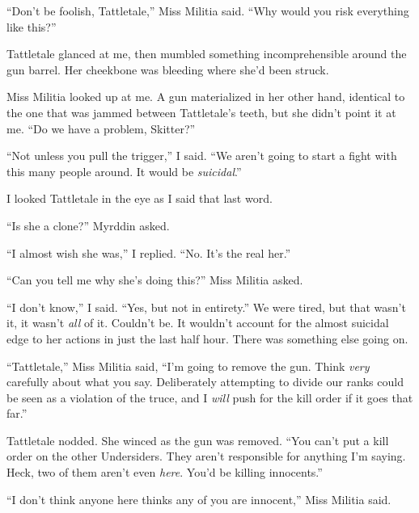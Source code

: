 ``Don't be foolish, Tattletale,'' Miss Militia said.  ``Why would you risk everything like this?''



Tattletale glanced at me, then mumbled something incomprehensible around the gun barrel.  Her cheekbone was bleeding where she'd been struck.



Miss Militia looked up at me.  A gun materialized in her other hand, identical to the one that was jammed between Tattletale's teeth, but she didn't point it at me.  ``Do we have a problem, Skitter?''



``Not unless you pull the trigger,'' I said.  ``We aren't going to start a fight with this many people around.  It would be \emph{suicidal}.''



I looked Tattletale in the eye as I said that last word.



``Is she a clone?'' Myrddin asked.



``I almost wish she was,'' I replied.  ``No.  It's the real her.''



``Can you tell me why she's doing this?'' Miss Militia asked.



``I don't know,'' I said.  ``Yes, but not in entirety.''  We were tired, but that wasn't it, it wasn't \emph{all} of it.  Couldn't be.  It wouldn't account for the almost suicidal edge to her actions in just the last half hour.  There was something else going on.



``Tattletale,'' Miss Militia said, ``I'm going to remove the gun.  Think \emph{very} carefully about what you say.  Deliberately attempting to divide our ranks could be seen as a violation of the truce, and I \emph{will} push for the kill order if it goes that far.''



Tattletale nodded.  She winced as the gun was removed.  ``You can't put a kill order on the other Undersiders.  They aren't responsible for anything I'm saying.  Heck, two of them aren't even \emph{here}.  You'd be killing innocents.''



``I don't think anyone here thinks any of you are innocent,'' Miss Militia said.



